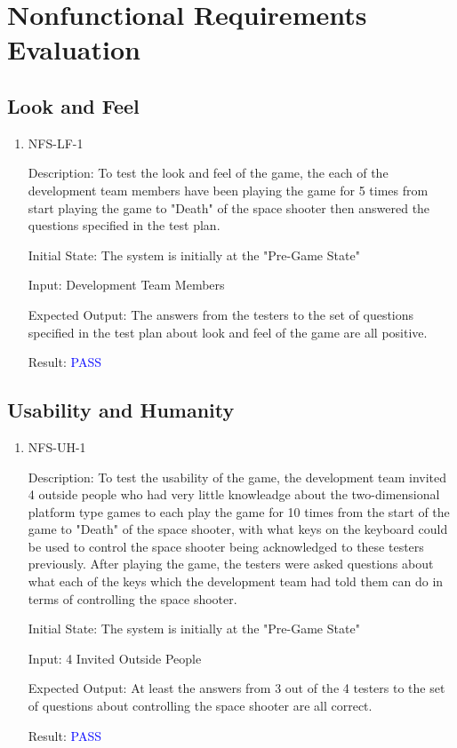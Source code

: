 \documentclass[12pt, titlepage]{article}
\begin{document}
\section{Nonfunctional Requirements Evaluation}



\subsection{Look and Feel}
\begin{enumerate}

\item{NFS-LF-1\\}

Description: To test the look and feel of the game, the each of the development team members have been playing the game for 5 times from start playing the game to "Death" of the space shooter then answered the questions specified in the test plan.

Initial State: The system is initially at the "Pre-Game State"
					
Input: Development Team Members

Expected Output: The answers from the testers to the set of questions specified in the test plan about look and feel of the game are all positive.

Result: \textcolor{blue}{PASS}
\end{enumerate}

\subsection{Usability and Humanity}

\begin{enumerate}

\item{NFS-UH-1\\}

Description: To test the usability of the game, the development team invited 4 outside people who had very little knowleadge about the two-dimensional platform type games to each play the game for 10 times from the start of the game to "Death" of the space shooter, with what keys on the keyboard could be used to control the space shooter being acknowledged to these testers previously. After playing the game, the testers were asked questions about what each of the keys which the development team had told them can do in terms of controlling the space shooter.

Initial State: The system is initially at the "Pre-Game State"
					
Input: 4 Invited Outside People

Expected Output: At least the answers from 3 out of the 4 testers to the set of questions about controlling the space shooter are all correct.

Result: \textcolor{blue}{PASS}
\end{enumerate}
\end{document}
